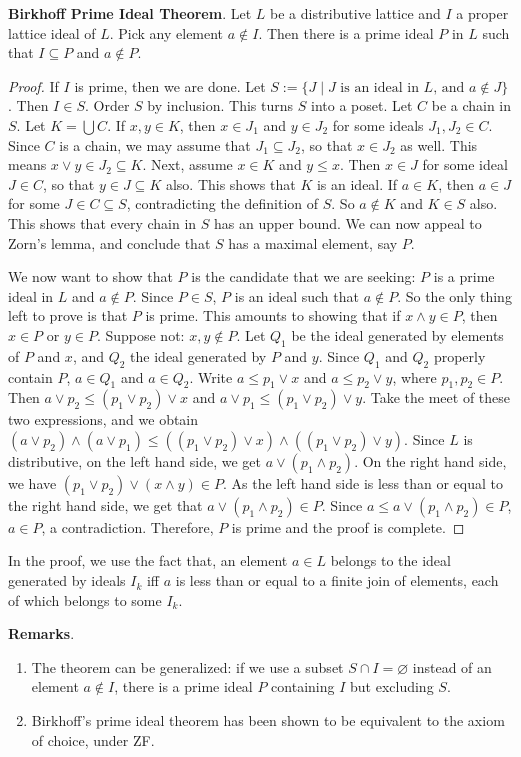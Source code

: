 \documentclass[12pt]{article}
\begin{document}
\textbf{Birkhoff Prime Ideal Theorem}.  Let $L$ be a distributive lattice and $I$ a proper lattice ideal of $L$.  Pick any element $a\notin I$.  Then there is a prime ideal $P$ in $L$ such that $I\subseteq P$ and $a\notin P$.

\begin{proof}
If $I$ is prime, then we are done.  Let $S:=\lbrace J\mid J\mbox{ is an ideal in }L\mbox{, and }a\notin J\rbrace$.  Then $I\in S$. Order $S$ by inclusion.  This turns $S$ into a poset.  Let $C$ be a chain in $S$.  Let $K=\bigcup C$.  If $x,y\in K$, then $x\in J_1$ and $y\in J_2$ for some ideals $J_1,J_2\in C$.  Since $C$ is a chain, we may assume that $J_1\subseteq J_2$, so that $x\in J_2$ as well.  This means $x\vee y\in J_2\subseteq K$.  Next, assume $x\in K$ and $y\le x$.  Then $x\in J$ for some ideal $J\in C$, so that $y\in J\subseteq K$ also.  This shows that $K$ is an ideal.  If $a\in K$, then $a\in J$ for some $J\in C\subseteq S$, contradicting the definition of $S$.  So $a\notin K$ and $K\in S$ also.  This shows that every chain in $S$ has an upper bound.  We can now appeal to Zorn's lemma, and conclude that $S$ has a maximal element, say $P$.

We now want to show that $P$ is the candidate that we are seeking: $P$ is a prime ideal in $L$ and $a\notin P$.  Since $P\in S$, $P$ is an ideal such that $a\notin P$.  So the only thing left to prove is that $P$ is prime.  This amounts to showing that if $x\wedge y\in P$, then $x\in P$ or $y\in P$.  Suppose not: $x,y\notin P$.  Let $Q_1$ be the ideal generated by elements of $P$ and $x$, and $Q_2$ the ideal generated by $P$ and $y$.  Since $Q_1$ and $Q_2$ properly contain $P$, $a\in Q_1$ and $a\in Q_2$.  Write $a\le p_1\vee x$ and $a\le p_2\vee y$, where $p_1,p_2\in P$.  Then $a\vee p_2\le (p_1\vee p_2)\vee x$ and $a\vee p_1\le (p_1\vee p_2)\vee y$.  Take the meet of these two expressions, and we obtain $(a\vee p_2) \wedge (a\vee p_1)\le ((p_1\vee p_2)\vee x)\wedge((p_1\vee p_2)\vee y)$.  Since $L$ is distributive, on the left hand side, we get $a\vee (p_1\wedge p_2)$.  On the right hand side, we have $(p_1\vee p_2)\vee (x\wedge y)\in P$.  As the left hand side is less than or equal to the right hand side, we get that $a\vee (p_1\wedge p_2)\in P$.  Since $a\le a\vee (p_1\wedge p_2)\in P$, $a\in P$, a contradiction.  Therefore, $P$ is prime and the proof is complete.
\end{proof}

In the proof, we use the fact that, an element $a\in L$ belongs to the ideal generated by ideals $I_k$ iff $a$ is less than or equal to a finite join of elements, each of which belongs to some $I_k$.


\textbf{Remarks}.  
\begin{enumerate}
\item
The theorem can be generalized: if we use a subset $S\cap I=\varnothing$ instead of an element $a\notin I$, there is a prime ideal $P$ containing $I$ but excluding $S$.
\item
Birkhoff's prime ideal theorem has been shown to be equivalent to the axiom of choice, under ZF.
\end{enumerate}
\end{document}
